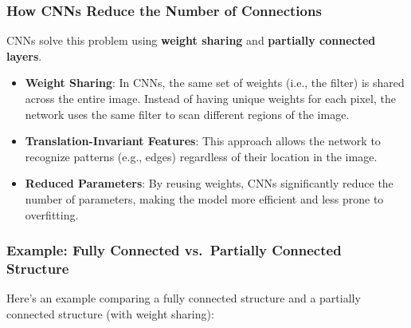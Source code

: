 \documentclass[
  letterpaper,
  DIV=11,
  numbers=noendperiod]{scrreprt}
\providecommand{\tightlist}{%
  \setlength{\itemsep}{0pt}\setlength{\parskip}{0pt}}\usepackage{longtable,booktabs,array}
\begin{document}
\subsubsection{How CNNs Reduce the Number of
Connections}\label{how-cnns-reduce-the-number-of-connections}

CNNs solve this problem using \textbf{weight sharing} and
\textbf{partially connected layers}.

\begin{itemize}
\tightlist
\item
  \textbf{Weight Sharing}: In CNNs, the same set of weights (i.e., the
  filter) is shared across the entire image. Instead of having unique
  weights for each pixel, the network uses the same filter to scan
  different regions of the image.
\item
  \textbf{Translation-Invariant Features}: This approach allows the
  network to recognize patterns (e.g., edges) regardless of their
  location in the image.
\item
  \textbf{Reduced Parameters}: By reusing weights, CNNs significantly
  reduce the number of parameters, making the model more efficient and
  less prone to overfitting.
\end{itemize}

\subsubsection{Example: Fully Connected vs.~Partially Connected
Structure}\label{example-fully-connected-vs.-partially-connected-structure}

Here's an example comparing a fully connected structure and a partially
connected structure (with weight sharing):
\end{document}
